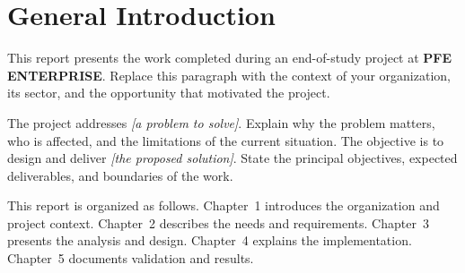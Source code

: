 \chapter*{General Introduction}

This report presents the work completed during an end-of-study project at \textbf{PFE ENTERPRISE}. Replace this paragraph with the context of your organization, its sector, and the opportunity that motivated the project.

The project addresses \textit{[a problem to solve]}. Explain why the problem matters, who is affected, and the limitations of the current situation. The objective is to design and deliver \textit{[the proposed solution]}. State the principal objectives, expected deliverables, and boundaries of the work.

This report is organized as follows. Chapter~1 introduces the organization and project context. Chapter~2 describes the needs and requirements. Chapter~3 presents the analysis and design. Chapter~4 explains the implementation. Chapter~5 documents validation and results.
